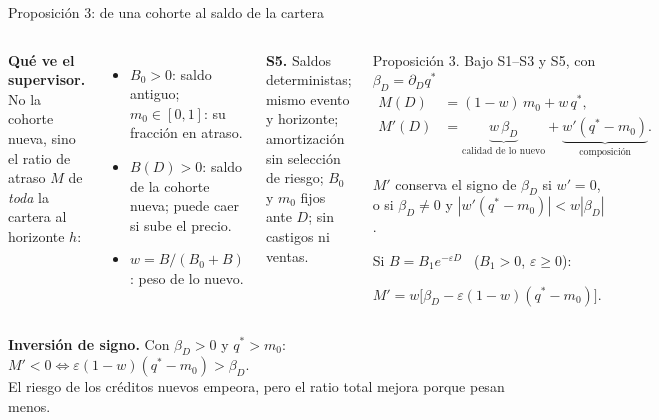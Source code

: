 \documentclass[aspectratio=169,10pt,t]{beamer}
\newcommand{\qs}{q^{*}}
\begin{document}
\begin{frame}{Proposición 3: de una cohorte al saldo de la cartera}
\vspace{1.3mm}
\begin{columns}[T,onlytextwidth]
\small
\textbf{Qué ve el supervisor.} No la cohorte nueva, sino el ratio de atraso $M$ de
\emph{toda} la cartera al horizonte $h$:
\begin{itemize}\setlength{\itemsep}{.3mm}
\item $B_{0}>0$: saldo antiguo; $m_{0}\in[0,1]$: su fracción en atraso.
\item $B(D)>0$: saldo de la cohorte nueva; puede caer si sube el precio.
\item $w=B/(B_{0}+B)$: peso de lo nuevo.
\end{itemize}
\begin{plainbox}\footnotesize
\textbf{S5.} Saldos deterministas; mismo evento y horizonte; amortización sin
selección de riesgo; $B_{0}$ y $m_{0}$ fijos ante $D$; sin castigos ni ventas.
\end{plainbox}
\begin{propbox}{Proposición 3. Bajo S1--S3 y S5, con $\beta_{D}=\partial_{D}\qs$}
\small
\vspace{-3mm}
\begin{align*}
M(D)&=(1-w)\,m_{0}+w\,\qs,\\
M'(D)&=\underbrace{w\,\beta_{D}}_{\text{calidad de lo nuevo}}
+\underbrace{w'(\qs-m_{0})}_{\text{composición}}.
\end{align*}
\vspace{-4mm}

$M'$ conserva el signo de $\beta_{D}$ si $w'=0$, o si $\beta_{D}\neq 0$ y
$|w'(\qs-m_{0})|<w|\beta_{D}|$.

\vspace{.6mm}
Si $B=B_{1}e^{-\varepsilon D}$ \ ($B_{1}>0$, $\varepsilon\ge 0$):\\[.4mm]
\centerline{$M'=w\bigl[\beta_{D}-\varepsilon(1-w)(\qs-m_{0})\bigr]$.}
\end{propbox}
\end{columns}
\begin{keybox}\small
\textbf{Inversión de signo.} Con $\beta_{D}>0$ y $\qs>m_{0}$:\quad
$M'<0\iff \varepsilon(1-w)(\qs-m_{0})>\beta_{D}$.\\
El riesgo de los créditos nuevos empeora, pero el ratio total mejora porque pesan
menos.
\end{keybox}
\end{frame}
\end{document}
